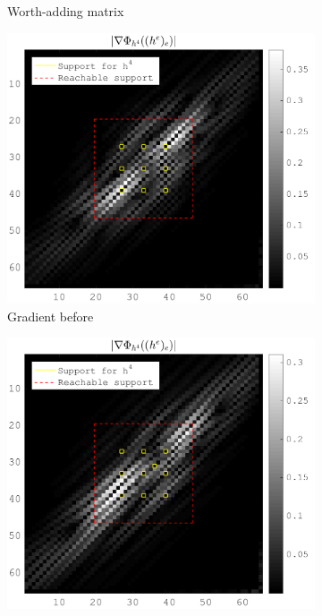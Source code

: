 \begin{figure}[!h]
\begin{subfigure}[b]{0.32\textwidth}
\caption{Worth-adding matrix} \label{fig_worth_adding_mat}
\end{subfigure}
\begin{subfigure}[b]{0.32\textwidth}\centering
\includegraphics[width=\textwidth]{figures/before_after/xp_128x128_sc2_angl1_K3_S3_node4before_partgrad4.png}
\caption{Gradient before} \label{fig_grad_before}
\end{subfigure}
\begin{subfigure}[b]{0.32\textwidth}\centering
\includegraphics[width=\textwidth]{figures/before_after/xp_128x128_sc2_angl1_K3_S3_node4after_partgrad4.png}

\end{subfigure}
\end{figure}
